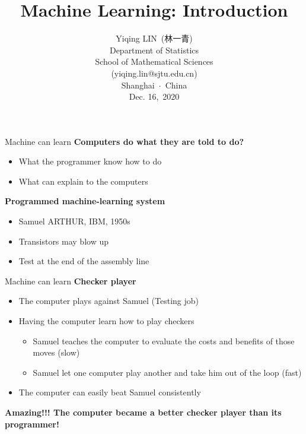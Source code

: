 \documentclass{beamer}
\title{Machine Learning: Introduction}
\author{Yiqing LIN\ (林一青)\\[6pt]
Department of Statistics\\
School of Mathematical Sciences\\[6pt]
 (yiqing.lin@sjtu.edu.cn)\\[24pt]
Shanghai\ $\cdot$\ China\\[3pt]Dec. 16,\ 2020}
\date{} %
\begin{document}
{ 
\frame{\titlepage}}





\begin{frame}{Machine can learn}
\textbf{Computers do what they are told to do?}
\begin{itemize}
\item What the programmer know how to do
\item What can explain to the computers
\end{itemize}
\vspace{6pt}
\textbf{Programmed machine-learning system}
\begin{itemize}
\item Samuel ARTHUR, IBM, 1950s
\item Transistors may blow up
\item Test at the end of the assembly line
\end{itemize}
\end{frame}

\begin{frame}{Machine can learn}
\textbf{Checker player}
\begin{itemize}
\item The computer plays against Samuel (Testing job)
\item Having the computer learn how to play checkers
\begin{itemize}
\item Samuel teaches the computer to evaluate the costs and benefits of those moves (slow)
\item Samuel let one computer play another and take him out of the loop (fast)
\end{itemize}
\item The computer can easily beat Samuel consistently
\end{itemize}
\vspace{6pt}
\textbf{Amazing!!! The computer became a better checker player than its programmer!}
\end{frame}
\end{document}
